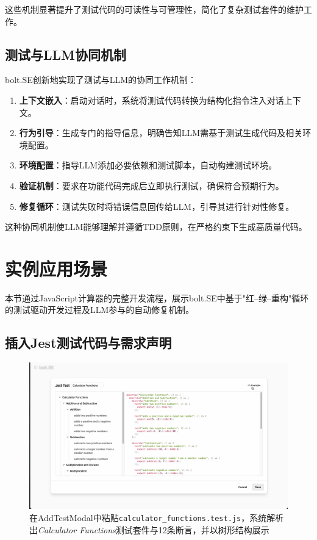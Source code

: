 这些机制显著提升了测试代码的可读性与可管理性，简化了复杂测试套件的维护工作。

\subsection{测试与LLM协同机制}

bolt.SE创新地实现了测试与LLM的协同工作机制：

\begin{enumerate}
  \item \textbf{上下文嵌入}：启动对话时，系统将测试代码转换为结构化指令注入对话上下文。
  
  \item \textbf{行为引导}：生成专门的指导信息，明确告知LLM需基于测试生成代码及相关环境配置。
  
  \item \textbf{环境配置}：指导LLM添加必要依赖和测试脚本，自动构建测试环境。
  
  \item \textbf{验证机制}：要求在功能代码完成后立即执行测试，确保符合预期行为。
  
  \item \textbf{修复循环}：测试失败时将错误信息回传给LLM，引导其进行针对性修复。
\end{enumerate}

这种协同机制使LLM能够理解并遵循TDD原则，在严格约束下生成高质量代码。

\section{实例应用场景}
\label{sec:tdd-example}

本节通过JavaScript计算器的完整开发流程，展示bolt.SE中基于"红–绿–重构"循环的测试驱动开发过程及LLM参与的自动修复机制。

\subsection{插入Jest测试代码与需求声明}

\begin{figure}[htbp]
  \centering
  \includegraphics[width=.9\textwidth]{figures/screenshots/tdd/add_test_modal.png}
  \caption{在AddTestModal中粘贴\texttt{calculator\_functions.test.js}，系统解析出\textit{Calculator Functions}测试套件与12条断言，并以树形结构展示}
  \label{fig:tdd_add_test}
\end{figure}

